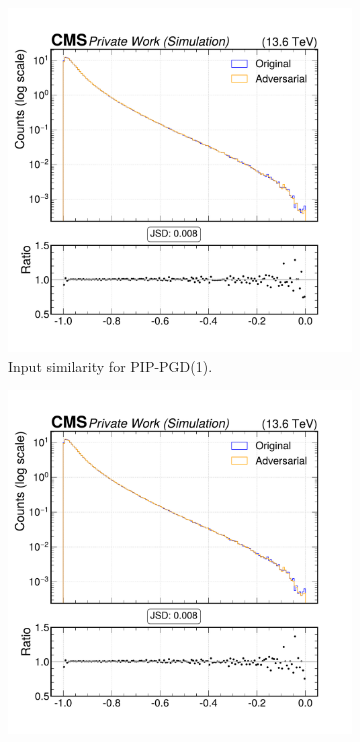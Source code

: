 \begin{figure}[h]
  \centering
  \begin{subfigure}[t]{0.32\textwidth}
    \includegraphics[width=\linewidth]{media/output/features/compare/combined_it_1/cmp_cpf_arr_Cpfcan_ptrel.pdf}
    \caption*{Input similarity for PIP-PGD(1).}
  \end{subfigure}\hfill
  \begin{subfigure}[t]{0.32\textwidth}
    \includegraphics[width=\linewidth]{media/output/features/compare/combined_it_2/cmp_cpf_arr_Cpfcan_ptrel.pdf}

\end{subfigure}
\end{figure}
